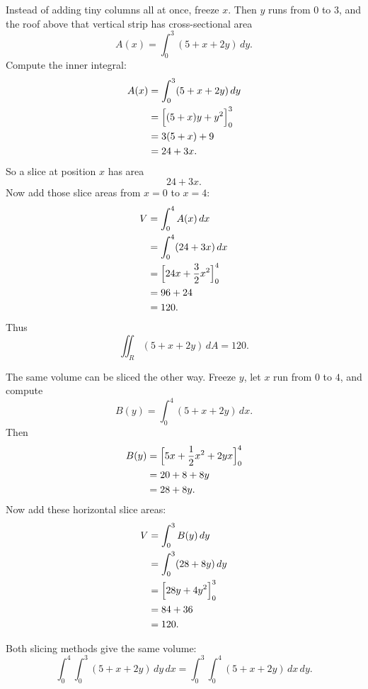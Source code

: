 Instead of adding tiny columns all at once, freeze \(x\).  Then \(y\) runs from \(0\) to
\(3\), and the roof above that vertical strip has cross-sectional area
\[
    A(x)=\int_0^3 (5+x+2y)\,dy.
\]
Compute the inner integral:
\[
\begin{aligned}
    A(x)
    &=
    \int_0^3 (5+x+2y)\,dy      \\
    &=
    \Bigl[(5+x)y+y^2\Bigr]_0^3 \\
    &=
    3(5+x)+9                  \\
    &=
    24+3x.
\end{aligned}
\]
So a slice at position \(x\) has area
\[
    24+3x.
\]
Now add those slice areas from \(x=0\) to \(x=4\):
\[
\begin{aligned}
    V
    &=
    \int_0^4 A(x)\,dx       \\
    &=
    \int_0^4 (24+3x)\,dx    \\
    &=
    \Bigl[24x+\frac32x^2\Bigr]_0^4 \\
    &=
    96+24                  \\
    &=
    120.
\end{aligned}
\]
Thus
\[
\boxed{
    \iint_R (5+x+2y)\,dA=120.
}
\]

The same volume can be sliced the other way.  Freeze \(y\), let \(x\) run from \(0\) to
\(4\), and compute
\[
    B(y)=\int_0^4 (5+x+2y)\,dx.
\]
Then
\[
\begin{aligned}
    B(y)
    &=
    \Bigl[5x+\frac12x^2+2yx\Bigr]_0^4 \\
    &=
    20+8+8y                         \\
    &=
    28+8y.
\end{aligned}
\]
Now add these horizontal slice areas:
\[
\begin{aligned}
    V
    &=
    \int_0^3 B(y)\,dy              \\
    &=
    \int_0^3 (28+8y)\,dy           \\
    &=
    \Bigl[28y+4y^2\Bigr]_0^3       \\
    &=
    84+36                          \\
    &=
    120.
\end{aligned}
\]

Both slicing methods give the same volume:
\[
\boxed{
    \int_0^4\int_0^3 (5+x+2y)\,dy\,dx
    =
    \int_0^3\int_0^4 (5+x+2y)\,dx\,dy.
}
\]

